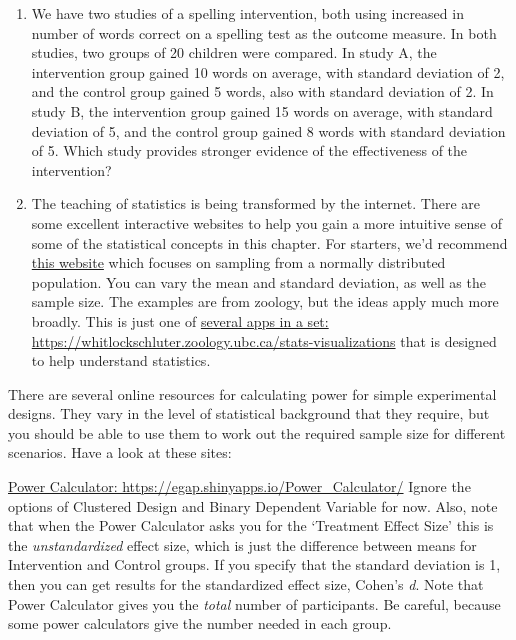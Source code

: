 \documentclass{krantz}
\begin{document}
\begin{enumerate}
\def\labelenumi{\arabic{enumi}.}
\item
  We have two studies of a spelling intervention, both using increased in number of words correct on a spelling test as the outcome measure. In both studies, two groups of 20 children were compared. In study A, the intervention group gained 10 words on average, with standard deviation of 2, and the control group gained 5 words, also with standard deviation of 2. In study B, the intervention group gained 15 words on average, with standard deviation of 5, and the control group gained 8 words with standard deviation of 5. Which study provides stronger evidence of the effectiveness of the intervention?
\item
  The teaching of statistics is being transformed by the internet. There are some excellent interactive websites to help you gain a more intuitive sense of some of the statistical concepts in this chapter. For starters, we'd recommend \href{https://www.zoology.ubc.ca/~whitlock/Kingfisher/SamplingNormal.htm}{this website} which focuses on sampling from a normally distributed population. You can vary the mean and standard deviation, as well as the sample size. The examples are from zoology, but the ideas apply much more broadly. This is just one of \href{https://whitlockschluter.zoology.ubc.ca/stats-visualizations}{several apps in a set: https://whitlockschluter.zoology.ubc.ca/stats-visualizations} that is designed to help understand statistics.
\end{enumerate}

There are several online resources for calculating power for simple experimental designs. They vary in the level of statistical background that they require, but you should be able to use them to work out the required sample size for different scenarios. Have a look at these sites:

\href{https://egap.shinyapps.io/Power_Calculator/}{Power Calculator: https://egap.shinyapps.io/Power\_Calculator/}  
 Ignore the options of Clustered Design and Binary Dependent Variable for now. Also, note that when the Power Calculator asks you for the `Treatment Effect Size' this is the \emph{unstandardized} effect size, which is just the difference between means for Intervention and Control groups. If you specify that the standard deviation is 1, then you can get results for the standardized effect size, Cohen's \emph{d}. Note that Power Calculator gives you the \emph{total} number of participants. Be careful, because some power calculators give the number needed in each group.
\end{document}
